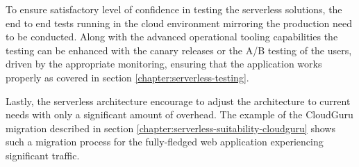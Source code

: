 To ensure satisfactory level of confidence in testing the serverless solutions, the end to end tests running in the cloud environment mirroring the production need to be conducted. Along with the advanced operational tooling capabilities the testing can be enhanced with the canary releases or the A/B testing of the users, driven by the appropriate monitoring, ensuring that the application works properly as covered in section \ref{chapter:serverless-testing}.

Lastly, the serverless architecture encourage to adjust the architecture to current needs with only a significant amount of overhead. The example of the CloudGuru migration described in section \ref{chapter:serverless-suitability-cloudguru} shows such a migration process for the fully-fledged web application experiencing significant traffic.









